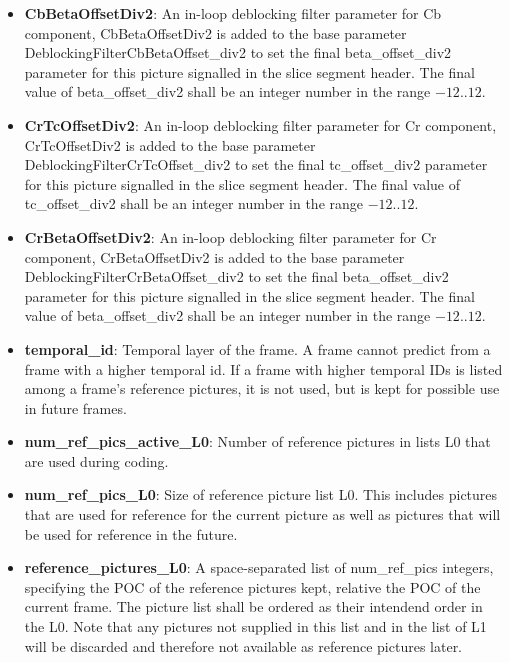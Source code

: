 ﻿\documentclass[a4paper,11pt]{jvetdoc}
\begin{document}
\begin{itemize}
\item[]\textbf{CbBetaOffsetDiv2}: An in-loop deblocking filter parameter for Cb component, CbBetaOffsetDiv2 
is added to the base parameter DeblockingFilterCbBetaOffset_div2 to set the final beta_offset_div2 
parameter for this picture signalled in the slice segment header. The final 
value of beta_offset_div2 shall be an integer number in the range $-12..12$.

\item[]\textbf{CrTcOffsetDiv2}: An in-loop deblocking filter parameter for Cr component, CrTcOffsetDiv2 
is added to the base parameter DeblockingFilterCrTcOffset_div2 to set the final tc_offset_div2 
parameter for this picture signalled in the slice segment header. The final 
value of tc_offset_div2 shall be an integer number in the range $-12..12$.

\item[]\textbf{CrBetaOffsetDiv2}: An in-loop deblocking filter parameter for Cr component, CrBetaOffsetDiv2 
is added to the base parameter DeblockingFilterCrBetaOffset_div2 to set the final beta_offset_div2 
parameter for this picture signalled in the slice segment header. The final 
value of beta_offset_div2 shall be an integer number in the range $-12..12$.

\item[]\textbf{temporal_id}: Temporal layer of the frame. A frame cannot
predict from a frame with a higher temporal id. If a frame with higher
temporal IDs is listed among a frame's reference pictures, it is
not used, but is kept for possible use in future frames.

\item[]\textbf{num_ref_pics_active_L0}: Number of reference pictures in lists L0
that are used during coding.

\item[]\textbf{num_ref_pics_L0}: Size of reference picture list L0.
This includes pictures that are used for reference for the
current picture as well as pictures that will be used for reference in
the future.

\item[]\textbf{reference_pictures_L0}: A space-separated list of
num_ref_pics integers, specifying the POC of the reference pictures
kept, relative the POC of the current frame. The picture list shall be
ordered as their intendend order in the L0.
Note that any pictures not supplied in this list and in the list of L1 will be discarded and
therefore not available as reference pictures later.


\end{itemize}
\end{document}
